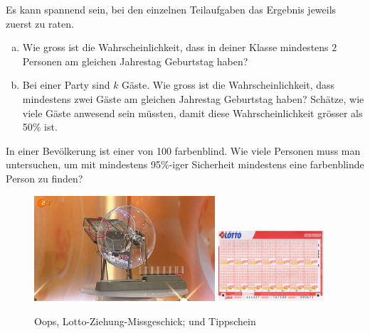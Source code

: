 \documentclass[%
11pt,%
twoside,%
titlepage,%
german,%
headsepline%
]{scrartcl}
\begin{document}
\begin{ueb}[Geburtstagsparadoxon]
Es
kann spannend sein, bei den einzelnen Teilaufgaben das Ergebnis jeweils zuerst zu raten.
\begin{enumerate}[a)]
\item Wie gross ist die Wahrscheinlichkeit, dass in deiner Klasse mindestens $2$ Personen am gleichen Jahrestag Geburtstag haben?
\item Bei einer Party sind $k$ Gäste. Wie gross ist die Wahrscheinlichkeit, dass mindestens zwei Gäste am gleichen Jahrestag Geburtstag haben? Schätze, wie viele Gäste anwesend sein müssten, damit diese Wahrscheinlichkeit grösser als 50\% ist.
\end{enumerate}
\end{ueb}

\begin{ueb}[farbenblind]
In einer Bevölkerung ist einer von 100 farbenblind. Wie viele Personen muss man untersuchen, um mit mindestens 95\%-iger Sicherheit mindestens eine farbenblinde Person zu finden?
\end{ueb}

\begin{figure}
  \begin{center}
    \includegraphics[width=0.6\textwidth]{pictures/lotto}
    \includegraphics[width=0.35\textwidth]{pictures/CHLotto}
  \end{center}
\caption{Oops, Lotto-Ziehung-Missgeschick; und Tippschein}
\end{figure}
\end{document}
